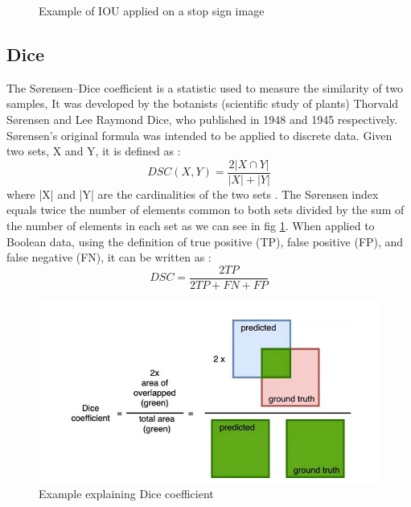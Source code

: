 \begin{figure}[H]
\centering
  \vspace{-0.1in}
    \centerline{}
    \caption{Example of IOU applied on a stop sign image}
\end{figure}

\subsection{Dice}
\hspace{\parindent}
The Sørensen–Dice coefficient is a statistic used to measure the similarity of two samples, It was developed by the botanists (scientific study of plants) Thorvald Sørensen and Lee Raymond Dice, who published in 1948 and 1945 respectively.\\
Sørensen's original formula was intended to be applied to discrete data. Given two sets, X and Y, it is defined as :
\begin{equation}
    DSC(X, Y) = \frac{2 | X \cap Y |}{| X |  +  | Y |}
\end{equation}
where |X| and |Y| are the cardinalities of the two sets . The Sørensen index equals twice the number of elements common to both sets divided by the sum of the number of elements in each set as we can see in fig \ref{fig:DSC_EX}. 
When applied to Boolean data, using the definition of true positive (TP), false positive (FP), and false negative (FN), it can be written as :
\begin{equation}
    DSC = \frac{2 TP}{2 TP + FN + FP}
\end{equation}

\begin{figure}[H]
\centering
  \vspace{-0.1in}
    \centerline{\includegraphics[width = 4.8in]{../images/DSC.png}}
    \caption{Example explaining Dice coefficient}
    \label{fig:DSC_EX}
\end{figure}

